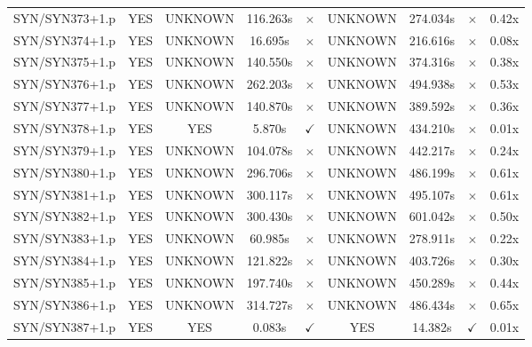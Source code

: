 \documentclass[a4paper,10pt]{article}
\begin{document}
\begin{longtable}{lcccccccc}
SYN/SYN373+1.p & YES & UNKNOWN & 116.263s & \cellcolor{mismatchcolor}$\times$ & UNKNOWN & 274.034s & \cellcolor{mismatchcolor}$\times$ & 0.42x \\
SYN/SYN374+1.p & YES & UNKNOWN & 16.695s & \cellcolor{mismatchcolor}$\times$ & UNKNOWN & 216.616s & \cellcolor{mismatchcolor}$\times$ & 0.08x \\
SYN/SYN375+1.p & YES & UNKNOWN & 140.550s & \cellcolor{mismatchcolor}$\times$ & UNKNOWN & 374.316s & \cellcolor{mismatchcolor}$\times$ & 0.38x \\
SYN/SYN376+1.p & YES & UNKNOWN & 262.203s & \cellcolor{mismatchcolor}$\times$ & UNKNOWN & 494.938s & \cellcolor{mismatchcolor}$\times$ & 0.53x \\
SYN/SYN377+1.p & YES & UNKNOWN & 140.870s & \cellcolor{mismatchcolor}$\times$ & UNKNOWN & 389.592s & \cellcolor{mismatchcolor}$\times$ & 0.36x \\
SYN/SYN378+1.p & YES & YES & 5.870s & \cellcolor{matchcolor}$\checkmark$ & UNKNOWN & 434.210s & \cellcolor{mismatchcolor}$\times$ & 0.01x \\
SYN/SYN379+1.p & YES & UNKNOWN & 104.078s & \cellcolor{mismatchcolor}$\times$ & UNKNOWN & 442.217s & \cellcolor{mismatchcolor}$\times$ & 0.24x \\
SYN/SYN380+1.p & YES & UNKNOWN & 296.706s & \cellcolor{mismatchcolor}$\times$ & UNKNOWN & 486.199s & \cellcolor{mismatchcolor}$\times$ & 0.61x \\
SYN/SYN381+1.p & YES & UNKNOWN & 300.117s & \cellcolor{mismatchcolor}$\times$ & UNKNOWN & 495.107s & \cellcolor{mismatchcolor}$\times$ & 0.61x \\
SYN/SYN382+1.p & YES & UNKNOWN & 300.430s & \cellcolor{mismatchcolor}$\times$ & UNKNOWN & 601.042s & \cellcolor{mismatchcolor}$\times$ & 0.50x \\
SYN/SYN383+1.p & YES & UNKNOWN & 60.985s & \cellcolor{mismatchcolor}$\times$ & UNKNOWN & 278.911s & \cellcolor{mismatchcolor}$\times$ & 0.22x \\
SYN/SYN384+1.p & YES & UNKNOWN & 121.822s & \cellcolor{mismatchcolor}$\times$ & UNKNOWN & 403.726s & \cellcolor{mismatchcolor}$\times$ & 0.30x \\
SYN/SYN385+1.p & YES & UNKNOWN & 197.740s & \cellcolor{mismatchcolor}$\times$ & UNKNOWN & 450.289s & \cellcolor{mismatchcolor}$\times$ & 0.44x \\
SYN/SYN386+1.p & YES & UNKNOWN & 314.727s & \cellcolor{mismatchcolor}$\times$ & UNKNOWN & 486.434s & \cellcolor{mismatchcolor}$\times$ & 0.65x \\
SYN/SYN387+1.p & YES & YES & 0.083s & \cellcolor{matchcolor}$\checkmark$ & YES & 14.382s & \cellcolor{matchcolor}$\checkmark$ & 0.01x \\

\end{longtable}
\end{document}
